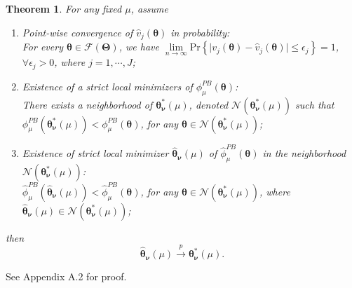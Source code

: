 \documentclass[12pt]{article}
\newcommand{\wh}{\widehat}
\newcommand{\bs}{ \boldsymbol}
\newcommand{\ml}{\mathcal}
\newcommand{\lt}{\left}
\newcommand{\rt}{\right}
\newtheorem{theorem}{Theorem}[section]
\begin{document}
\begin{theorem}
	For any fixed $\mu$, assume 
	\begin{enumerate}
		\item Point-wise convergence of $\wh{v}_j(\bs{\theta})$ in probability:\\ For every $ \bs{\theta} \in \ml{F}(\bs{\Theta})$, we have $ \underset{n \to \infty}{\lim} \text{Pr} \lt\{ \mid v_j(\bs{\theta}) - \wh{v}_j(\bs{\theta}) \mid \le \epsilon_j \rt\}  = 1$, $\forall \epsilon_j > 0$, where $j = 1, \cdots, J$;
		\item Existence of a strict local minimizers of $\phi^{PB}_{\mu}\lt(\bs{\theta}\rt)$:\\
		There exists a neighborhood of $\bs{\theta}^{*}_{\bs{\nu}}(\mu)$, denoted $\ml{N}\lt(\bs{\theta}^{*}_{\bs{\nu}}(\mu)\rt)$ such that $\phi^{PB}_{\mu}\lt(\bs{\theta}^{*}_{\bs{\nu}}(\mu)\rt) < \phi^{PB}_{\mu}\lt(\bs{\theta}\rt)$, for any $\bs{\theta} \in \ml{N}\lt(\bs{\theta}^{*}_{\bs{\nu}}(\mu)\rt)$;
		\item Existence of strict local minimizer $\wh{\bs{\theta}}_{\bs{\nu}}(\mu)$ of $\wh{\phi}^{PB}_{\mu}\lt(\bs{\theta}\rt)$ in the neighborhood $\ml{N}\lt(\bs{\theta}^{*}_{\bs{\nu}}(\mu)\rt)$:\\  
		$ \wh{\phi}^{PB}_{\mu}\lt(\wh{\bs{\theta}}_{\bs{\nu}}(\mu)\rt) < \wh{\phi}^{PB}_{\mu}\lt(\bs{\theta}\rt)$, for any $\bs{\theta} \in \ml{N}\lt(\bs{\theta}^{*}_{\bs{\nu}}(\mu)\rt)$, where $\wh{\bs{\theta}}_{\bs{\nu}}(\mu) \in \ml{N}\lt(\bs{\theta}^{*}_{\bs{\nu}}(\mu)\rt)$;
	\end{enumerate} then 
	$$\wh{\bs{\theta}}_{\bs{\nu}}(\mu) \overset{p}{\to} \bs{\theta}^{*}_{\bs{\nu}}(\mu).$$
	
\end{theorem}
See Appendix A.2 for proof.
\end{document}
